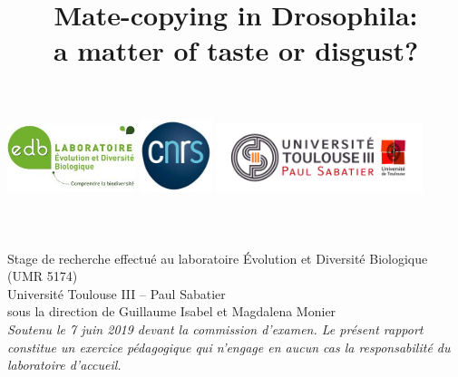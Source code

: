 \documentclass[a4paper, 12pt]{article}
\begin{document}
\title{Mate-copying in Drosophila:\\ a matter of taste or disgust?}		
  \makeatletter
    \begin{titlepage}
	         \begin{center}
		  \includegraphics[width=0.28\textwidth]{images/edb}\hspace{2em}
		 \includegraphics[width=0.16\textwidth]{images/cnrs}\hspace{0.5em}
		  \includegraphics[width=0.45\textwidth]{images/paulsab}\\
		             [3.6em]
		             {\Large
			                 \bfseries \@title }\\[2em]
		             {\large \@author}\\[1.2em]
		             
		             {\large \@date}\\
		             \vspace{2.8 em}
		             {\normalsize
			             Stage de recherche effectué au laboratoire Évolution et 
			 Diversité Biologique (UMR 5174)\\
			             Université Toulouse III -- Paul Sabatier\\
			             sous la direction de Guillaume Isabel et Magdalena Monier}\\
		            \vspace{2.8 em}
 {\normalsize \emph{Soutenu le 7 juin 2019 devant la
		 commission d'examen. Le présent rapport constitue un exercice 
		 pédagogique qui n'engage en aucun cas la responsabilité du laboratoire 
		 d'accueil.}}
         \end{center}
     \end{titlepage}
     \makeatother
     \thispagestyle{empty}
     \newpage
\end{document}

